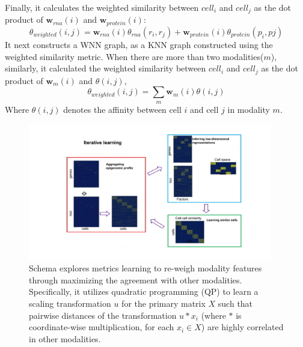 Finally, it calculates the weighted similarity between $cell_i$ and $cell_j$ as the dot product of $\textbf{w}_{rna}(i)$ and $\textbf{w}_{protein}(i)$:
\begin{equation}
	\theta_{weighted}(i,j)=\textbf{w}_{rna}(i)\theta_{rna}(r_i,r_j) + \textbf{w}_{protein}(i)\theta_{protein}(p_i,pj)
\end{equation}
It next constructs a WNN graph, as a KNN graph constructed using the weighted similarity metric. When there are more than two modalities($m$), similarly, it calculated the weighted similarity between $cell_i$ and $cell_j$ as the dot product of $\textbf{w}_m(i)$ and $\theta(i,j)$,
\begin{equation}
	\theta_{weighted}(i,j)=\sum_{m} \textbf{w}_m(i)\theta(i,j)
\end{equation}
Where $\theta(i,j)$ denotes the affinity between cell $i$ and cell $j$ in modality $m$.

\begin{figure}[!hb]
	\centering
	\includegraphics[width=0.95\textwidth]{Alg_scAI/fig}
	\vspace{0.1cm}
	\caption[Illustration of Schema integration competing method.]{
	Schema explores metrics learning to re-weigh modality features through maximizing the agreement with other modalities. Specifically, it utilizes quadratic programming (QP) to learn a scaling transformation $u$ for the primary matrix $X$ such that pairwise distances of the transformation $u * x_i$ (where $*$ is coordinate-wise multiplication, for each $x_i\in X$) are highly correlated in other modalities.
}
	\label{fig:Alg_MOFA}
\end{figure}

